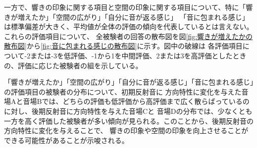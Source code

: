 \documentclass[11pt,a4j]{jreport}
\begin{document}
  一方で、響きの印象に関する項目と空間の印象に関する項目について、特に「響きが増えたか」「空間の広がり」「自分に音が返る感じ」
  「音に包まれる感じ」は標準偏差が大きく、平均値が全体の評価の傾向を代表しているとは言えない。これらの評価項目について、
  全被験者の回答の散布図を図\ref{fig:響きが増えたかの散布図}から\ref{fig:音に包まれる感じの散布図}に示す。図中の破線は
  各評価項目について-2または-3を低評価、-1から1を中間評価、2または3を高評価としたときの、評価に応じた被験者の組を示している。
  
  「響きが増えたか」「空間の広がり」「自分に音が返る感じ」「音に包まれる感じ」の評価項目の被験者の分布について、初期反射音に
  方向特性に変化を与えた音場Aと音場Bでは、どちらの評価も低評価から高評価まで広く散らばっているのに対し、後期反射音に方向特性を与えた音場Cと
  音場Dの分布では、少なくとも一方を高く評価した被験者が多い傾向が見られる。このことから、後期反射音の方向特性に変化を与えることで、
  響きの印象や空間の印象を向上させることができる可能性があることが示唆される。
  
\end{document}
